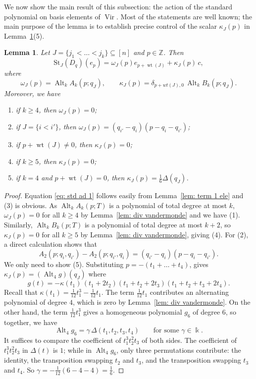 \documentclass[12pt]{amsart}
\theoremstyle{plain}
\newtheorem{lemma}[theorem]{Lemma}
\theoremstyle{definition}
\numberwithin{equation}{theorem}
\newcommand{\kk}{\Bbbk}
\newcommand{\Vir}{\operatorname{Vir}}
\newcommand{\Alt}{\operatorname{Alt}}
\newcommand{\ZZ}{\mathbb{Z}}
\newcommand{\St}{\mathrm{St}}
\newcommand{\wt}{\operatorname{wt}}
\begin{document}
We now show the main result of this subsection: the action of the standard polynomial on basis elements of $\Vir$. Most of the statements are well known; the main purpose of the lemma is to establish precise control of the scalar $\kappa_J (p)$ in Lemma~\ref{lem: one block}(5).
\begin{lemma}\label{lem: one block}
    Let $J = \{j_1 < \dots < j_k\} \subseteq [n]$ and $p \in \ZZ$. Then 
    \begin{equation}\label{eq: std ad 1}
        \St_J(D_q)(e_p) = \omega_J (p) e_{p+\wt(J)} +  \kappa_J (p) \, c,
    \end{equation}
    where
    \[\omega_J(p) = \Alt_k A_k(p; q_J), \qquad \kappa_J(p) = \delta_{p+wt(J), 0} \, \Alt_k B_k(p; q_J).\]    
    Moreover, we have 
    \begin{enumerate}[label=\textup{(\arabic*)}]
        \item if $k \geq 4$, then $\omega_J (p) = 0$;
        \item if $J = \{i < i'\}$, then $\omega_J(p) =(q_{i'} - q_i) (p - q_i - q_{i'})$;
        \item if $p+\wt(J) \neq 0$, then $\kappa_J(p) = 0$;
        \item if $k \ge 5$, then $\kappa_J(p) = 0$; 
        \item if $k = 4$ and $p+\wt(J) = 0$, then $\kappa_J(p) = \frac{1}{6}\Delta(q_J)$.
    \end{enumerate}
\end{lemma}
\begin{proof}
    Equation \eqref{eq: std ad 1} follows easily from Lemma~\ref{lem: term 1 ele} and (3) is obvious. As $\Alt_k A_k(p; T)$ is a polynomial of total degree at most $k$, $\omega_J (p) = 0$ for all $k \geq 4$  by Lemma~\ref{lem: div vandermonde} and we have (1). Similarly, $\Alt_k B_k(p; T)$ is a polynomial of total degree at most $k+2$, so $\kappa_J (p) = 0$ for all $k \geq 5$ by Lemma~\ref{lem: div vandermonde}, giving (4). For (2), a direct calculation shows that
    \[A_2(p; q_i, q_{i'}) - A_2(p; q_{i'}, q_{i}) = (q_{i'} - q_i) (p - q_i - q_{i'}).\]
    We only need to show (5). Substituting $p = -(t_1 + \dots + t_4)$, gives $\kappa_J(p) = (\Alt_4 g)(q_J)$ where 
    \[
        g(t) = -\kappa(t_1)\,(t_1 + 2t_2)(t_1 + t_2 + 2t_3)(t_1 + t_2 + t_3 + 2t_4).
    \]   
    Recall that $\kappa(t_1) = \frac{1}{12} t_1^3 - \frac{1}{12} t_1$. The term $\frac{1}{12} t_1$ contributes an alternating polynomial of degree $4$, which is zero by Lemma~\ref{lem: div vandermonde}. On the other hand, the term $\frac{1}{12}t_1^3$ gives a homogeneous polynomial $g_6$ of degree $6$, so together, we have
    \[\Alt_4 g_6 = \gamma\, \Delta(t_1, t_2, t_3, t_4) \qquad \text{for some } \gamma \in \kk.\]
    It suffices to compare the coefficient of $t_1^3 t_2^2 t_3$ of both sides. The coefficient of $t_1^3 t_2^2 t_3$ in $\Delta(t)$ is $1$; while in $\Alt_4 g_6$, only three permutations contribute: the identity, the transposition swapping $t_2$ and $t_3$, and the transposition swapping $t_3$ and $t_4$. So $\gamma = -\frac{1}{12}(6 - 4 - 4) = \frac{1}{6}$.
\end{proof}
\end{document}
